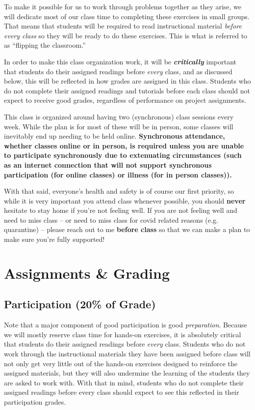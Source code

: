 \documentclass[12pt]{article}
\begin{document}
To make it possible for us to work through problems together as they arise, we will dedicate most of our class time to completing these exercises in small groups. That means that students will be required to read instructional material \emph{before every class} so they will be ready to do these exercises. This is what is referred to as ``flipping the classroom.''

In order to make this class organization work, it will be \textbf{\emph{critically}} important that students do their assigned readings before \emph{every} class, and as discussed below, this will be reflected in how grades are assigned in this class. Students who do not complete their assigned readings and tutorials before each class should not expect to receive good grades, regardless of performance on project assignments.

This class is organized around having two (synchronous) class sessions every week. While the plan is for most of these will be in person, some classes will inevitably end up needing to be held online. \textbf{Synchronous attendance, whether classes online or in person, is required unless you are unable to participate synchronously due to extenuating circumstances (such as an internet connection that will not support synchronous participation (for online classes) or illness (for in person classes)).}

With that said, everyone's health and safety is of course our first priority, so while it is very important you attend class whenever possible, you should \textbf{never} hesitate to stay home if you're not feeling well. If you are not feeling well and need to miss class -- or need to miss class for covid related reasons (e.g. quarantine) -- please reach out to me \textbf{before class} so that we can make a plan to make sure you're fully supported!


\section{Assignments \& Grading}

\subsection{Participation (20\% of Grade)}

Note that a major component of good participation is good \emph{preparation}. Because we will mostly reserve class time for hands-on exercises, it is absolutely critical that students do their assigned readings before \emph{every} class. Students who do not work through the instructional materials they have been assigned before class will not only get very little out of the hands-on exercises designed to reinforce the assigned materials, but they will also undermine the learning of the students they are asked to work with. With that in mind, students who do not complete their assigned readings before every class should expect to see this reflected in their participation grades.
\end{document}
